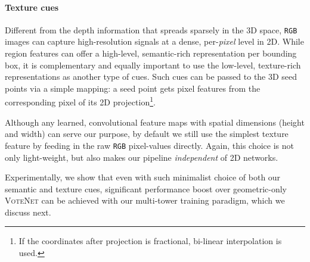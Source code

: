 \documentclass[10pt,twocolumn,letterpaper]{article}
\newcommand{\votenet}{\textsc{VoteNet}\xspace}
\newcommand{\rgb}{\texttt{RGB}\xspace}
\begin{document}
\paragraph{Texture cues} 
Different from the depth information that spreads sparsely in the 3D space, \rgb images can capture high-resolution signals at a dense, per-\emph{pixel} level in 2D. While region features can offer a high-level, semantic-rich representation per bounding box, it is complementary and equally important to use the low-level, texture-rich representations as another type of cues. Such cues can be passed to the 3D seed points via a simple mapping: a seed point gets pixel features from the corresponding pixel of its 2D projection\footnote{If the coordinates after projection is fractional, bi-linear interpolation is used.}.

Although any learned, convolutional feature maps with spatial dimensions (height and width) can serve our purpose, by default we still use the simplest texture feature by feeding in the raw \rgb pixel-values directly. Again, this choice is not only light-weight, but also makes our pipeline \emph{independent} of 2D networks. 

Experimentally, we show that even with such minimalist choice of both our semantic and texture cues, significant performance boost over geometric-only \votenet can be achieved with our multi-tower training paradigm, which we discuss next.
\end{document}

